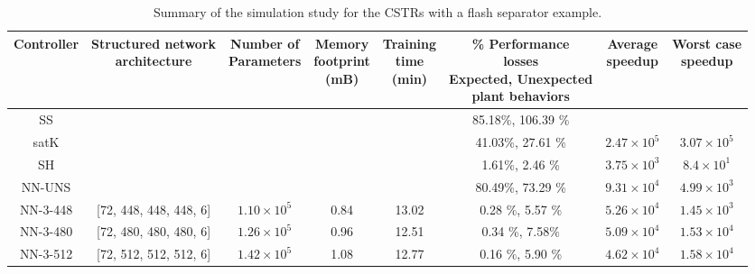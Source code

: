 \documentclass[preprint,5p, twocolumn, authoryear]{elsarticle}
\begin{document}
\begin{table}[t]
    \caption{Summary of the simulation study for the CSTRs with a flash
    separator example.}   
    \begin{tabular}{ |c|c|c|c|c|c|c|c| }
        \hline
        Controller & \thead{Structured network \\ architecture} & \thead{Number
        of \\ Parameters} & \thead{Memory \\ footprint \\ (mB)} &
        \thead{Training \\ time \\ (min)} & \thead{\% Performance\\ losses \\
        Expected, Unexpected \\ plant behaviors} & \thead{Average \\ speedup} &
        \thead{Worst case \\ speedup} \\
        \hline
    SS &  &  & &  & 85.18\%, 106.39 \% &  & \\ 
    satK &  &  &  &  & 41.03\%, 27.61 \% & $2.47 \times 10^5$ & $3.07 \times
    10^5$ \\ 
    SH &  &  &  &  & 1.61\%, 2.46 \% & $3.75 \times 10^3$ & $8.4 \times 10^1$ \\
    
    NN-UNS &  &  &  &  & 80.49\%, 73.29 \% & $9.31 \times 10^4$ & $4.99 \times
    10^3$ \\ 
NN-3-448 & [72, 448, 448, 448, 6] & $1.10 \times 10^5$ & 0.84 & 13.02 & 0.28 \%,
5.57 \% & $5.26 \times 10^4$ & $1.45 \times 10^3$ \\ 
NN-3-480 & [72, 480, 480, 480, 6]  & $1.26 \times 10^5$ & 0.96  & 12.51 & 0.34
\%, 7.58\% & $5.09 \times 10^4$ & $1.53 \times 10^4$ \\ 
NN-3-512 & [72, 512, 512, 512, 6]  & $1.42 \times 10^5$ & 1.08  & 12.77 & 0.16
\%, 5.90 \% & $4.62 \times 10^4$ & $1.58 \times 10^4$ \\ 
        \hline
       \end{tabular}
       \label{table:cstrs}      
\end{table}
\end{document}
